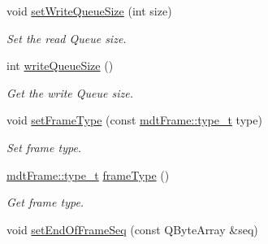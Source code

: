 \begin{DoxyCompactItemize}
void \hyperlink{classmdt_port_config_a8a99771f7acfeb546d1d89d3671407e5}{setWriteQueueSize} (int size)
\begin{DoxyCompactList}\small\item\em Set the read Queue size. \end{DoxyCompactList}\item 
int \hyperlink{classmdt_port_config_a476ae5e51401da1da4f01e40cc4441ab}{writeQueueSize} ()
\begin{DoxyCompactList}\small\item\em Get the write Queue size. \end{DoxyCompactList}\item 
void \hyperlink{classmdt_port_config_a627adcb87d26757238f844db19fc248d}{setFrameType} (const \hyperlink{classmdt_frame_af936e37d5fe4c066c0fb0161fafd4a17}{mdtFrame::type\_\-t} type)
\begin{DoxyCompactList}\small\item\em Set frame type. \end{DoxyCompactList}\item 
\hyperlink{classmdt_frame_af936e37d5fe4c066c0fb0161fafd4a17}{mdtFrame::type\_\-t} \hyperlink{classmdt_port_config_a547cb25cd2b1b0b3c40e7ebf023c7a1d}{frameType} ()
\begin{DoxyCompactList}\small\item\em Get frame type. \end{DoxyCompactList}\item 
\hypertarget{classmdt_port_config_a3c5e1c444a18da7d68430bd1c14030f4}{
void \hyperlink{classmdt_port_config_a3c5e1c444a18da7d68430bd1c14030f4}{setEndOfFrameSeq} (const QByteArray \&seq)}
\label{classmdt_port_config_a3c5e1c444a18da7d68430bd1c14030f4}


\end{DoxyCompactItemize}
